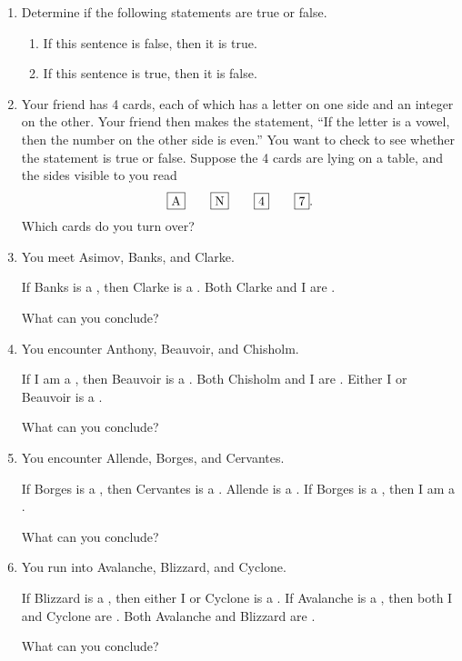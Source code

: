 \probsec{~\ref{sec:conditionals}}
\begin{enumerate}
    \item Determine if the following statements are true or false.
  \begin{enumerate}
      \item If this sentence is false, then it is true.
      \item If this sentence is true, then it is false.
  \end{enumerate}

    \item Your friend has 4 cards, each of which has a letter on one side and an integer on the other. Your friend then makes the statement, ``If the letter is a vowel, then the number on the other side is even.'' You want to check to see whether the statement is true or false. Suppose the 4 cards are lying on a table, and the sides visible to you read
  \[
  \framebox{A} \qquad \framebox{N} \qquad \framebox{4} \qquad \framebox{7}.
  \]
  Which cards do you turn over?

    \item You meet Asimov, Banks, and Clarke.
  \begin{dialogue}
     If Banks is a \knight, then Clarke is a \knave.
     Both Clarke and I are \knaves.
  \end{dialogue}
  What can you conclude?

    \item You encounter Anthony, Beauvoir, and Chisholm.
  \begin{dialogue}
     If I am a \knave, then Beauvoir is a \knight.
     Both Chisholm and I are \knights.
     Either I or Beauvoir is a \knave.
  \end{dialogue}
  What can you conclude?

    \item You encounter Allende, Borges, and Cervantes.
  \begin{dialogue}
     If Borges is a \knight, then Cervantes is a \knave.
     Allende is a \knave.
     If Borges is a \knight, then I am a \knave.
  \end{dialogue}
  What can you conclude?

    \item You run into Avalanche, Blizzard, and Cyclone.
  \begin{dialogue}
     If Blizzard is a \knight, then either I or Cyclone is a \knave.
     If Avalanche is a \knave, then both I and Cyclone are \knights.
     Both Avalanche and Blizzard are \knaves.
  \end{dialogue}
  What can you conclude?


\end{enumerate}
